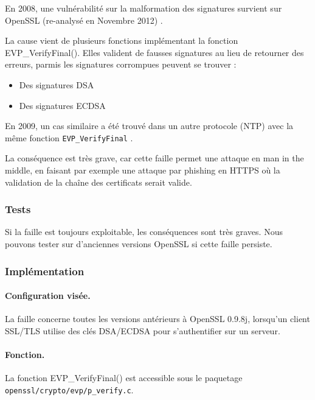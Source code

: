 		En 2008, une vulnérabilité sur la malformation des signatures survient sur OpenSSL (re-analysé en Novembre 2012) \cite{openssl2009secadv} \cite{cve-2008-5077}. 

		La cause vient de plusieurs fonctions implémentant la fonction EVP\_VerifyFinal(). Elles valident de fausses signatures au lieu de retourner des erreurs, parmis les signatures corrompues peuvent se trouver :
		\begin{itemize}
		\item Des signatures DSA
		\item Des signatures ECDSA
		\end{itemize}

		En 2009, un cas similaire a été trouvé dans un autre protocole (NTP) avec la même fonction \texttt{EVP\_VerifyFinal} \cite{cve-2009-0021}.

		La conséquence est très grave, car cette faille permet une attaque en man in the middle, en faisant par exemple une attaque par phishing en HTTPS où la validation de la chaîne des certificats serait valide.

		\subsubsection{Tests}

		Si la faille est toujours exploitable, les conséquences sont très graves. Nous pouvons tester sur d'anciennes versions OpenSSL si cette faille persiste.
		
		\subsubsection{Implémentation}
			
			\paragraph{Configuration visée.\\}
			
			La faille concerne toutes les versions antérieurs à OpenSSL 0.9.8j, lorsqu'un client SSL/TLS utilise des clés DSA/ECDSA pour s'authentifier sur un serveur. 

			\paragraph{Fonction.\\}
			La fonction EVP\_VerifyFinal() est accessible sous le paquetage \texttt{openssl/crypto/evp/p\_verify.c}.
		
